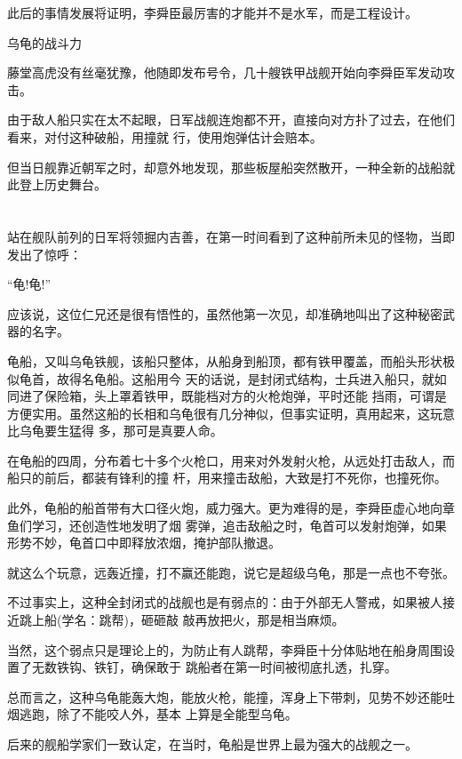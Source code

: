 \documentclass[11pt,a4paper,onecolumn]{article}
\begin{document}
此后的事情发展将证明，李舜臣最厉害的才能并不是水军，而是工程设计。

乌龟的战斗力

藤堂高虎没有丝毫犹豫，他随即发布号令，几十艘铁甲战舰开始向李舜臣军发动攻击。

由于敌人船只实在太不起眼，日军战舰连炮都不开，直接向对方扑了过去，在他们看来，对付这种破船，用撞就
行，使用炮弹估计会赔本。

但当日舰靠近朝军之时，却意外地发现，那些板屋船突然散开，一种全新的战船就此登上历史舞台。

\section[\thesection]{}

站在舰队前列的日军将领掘内吉善，在第一时间看到了这种前所未见的怪物，当即发出了惊呼：

``龟!龟!''

应该说，这位仁兄还是很有悟性的，虽然他第一次见，却准确地叫出了这种秘密武器的名字。

龟船，又叫乌龟铁舰，该船只整体，从船身到船顶，都有铁甲覆盖，而船头形状极似龟首，故得名龟船。这船用今
天的话说，是封闭式结构，士兵进入船只，就如同进了保险箱，头上罩着铁甲，既能档对方的火枪炮弹，平时还能
挡雨，可谓是方便实用。虽然这船的长相和乌龟很有几分神似，但事实证明，真用起来，这玩意比乌龟要生猛得
多，那可是真要人命。

在龟船的四周，分布着七十多个火枪口，用来对外发射火枪，从远处打击敌人，而船只的前后，都装有锋利的撞
杆，用来撞击敌船，大致是打不死你，也撞死你。

此外，龟船的船首带有大口径火炮，威力强大。更为难得的是，李舜臣虚心地向章鱼们学习，还创造性地发明了烟
雾弹，追击敌船之时，龟首可以发射炮弹，如果形势不妙，龟首口中即释放浓烟，掩护部队撤退。

就这么个玩意，远轰近撞，打不赢还能跑，说它是超级乌龟，那是一点也不夸张。

不过事实上，这种全封闭式的战舰也是有弱点的：由于外部无人警戒，如果被人接近跳上船(学名：跳帮)，砸砸敲
敲再放把火，那是相当麻烦。

当然，这个弱点只是理论上的，为防止有人跳帮，李舜臣十分体贴地在船身周围设置了无数铁钩、铁钉，确保敢于
跳船者在第一时间被彻底扎透，扎穿。

总而言之，这种乌龟能轰大炮，能放火枪，能撞，浑身上下带刺，见势不妙还能吐烟逃跑，除了不能咬人外，基本
上算是全能型乌龟。

后来的舰船学家们一致认定，在当时，龟船是世界上最为强大的战舰之一。
\end{document}
